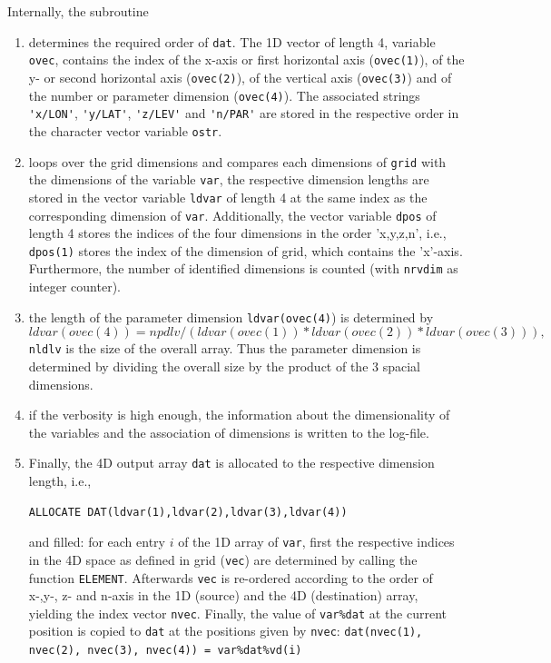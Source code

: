 \documentclass[11pt,twoside]{article}
\begin{document}
Internally, the subroutine 
\begin{enumerate}
\item determines the required order of \verb|dat|. The 1D vector of length 4,
variable \verb|ovec|, contains the index of the x-axis or first horizontal
axis (\verb|ovec(1)|), of the y- or second horizontal axis (\verb|ovec(2)|),
of the vertical axis (\verb|ovec(3)|) and of the number or parameter dimension
(\verb|ovec(4)|).  The associated
strings \verb|'x/LON'|, \verb|'y/LAT'|, \verb|'z/LEV'|
and \verb|'n/PAR'| are 
stored in the respective order in the character vector variable \verb|ostr|.

\item loops over the grid dimensions and compares each dimensions
of \verb|grid| with the dimensions of the variable \verb|var|, 
the respective dimension lengths are stored in the vector variable \verb|ldvar|
 of length 4 at the same index as the corresponding dimension of \verb|var|.
Additionally, the vector variable  \verb|dpos| of length 4 stores the indices
of the four dimensions in the order 'x,y,z,n', i.e., \verb|dpos(1)|
stores the index of the dimension of grid, which contains the 'x'-axis.
Furthermore, the number of identified dimensions is counted (with \verb|nrvdim|
as integer counter).
\item the length of the parameter dimension \verb|ldvar(ovec(4)|) is
determined by 
\begin{equation}
 ldvar(ovec(4)) = npdlv / (ldvar(ovec(1)) * ldvar(ovec(2)) * ldvar(ovec(3))),
\end{equation}
\verb|nldlv| is the size of the overall array. Thus the parameter dimension is
determined by dividing the overall size by the product of the 3 spacial
dimensions. 
\item if the verbosity is high enough, the information about the
dimensionality of the variables and the association of dimensions is
written to the log-file.
\item Finally, the 4D output array \verb|dat| is allocated to the
respective dimension length, i.e., 
\begin{verbatim}
ALLOCATE DAT(ldvar(1),ldvar(2),ldvar(3),ldvar(4))
\end{verbatim}
and filled: for each entry $i$ of the 1D array of \verb|var|, first
the respective indices in the 4D space as defined in grid (\verb|vec|) are
determined by calling the function \verb|ELEMENT|. 
Afterwards \verb|vec| is re-ordered according to the order of x-,y-,
z- and n-axis in the 1D (source) and the 4D (destination) array,
yielding the index vector \verb|nvec|.
 Finally, the value of \verb|var%dat| at the current position is copied to
 \verb|dat| at the positions given by \verb|nvec|:
\verb|dat(nvec(1), nvec(2), nvec(3), nvec(4)) = var%dat%vd(i)|
\end{enumerate}
\end{document}
